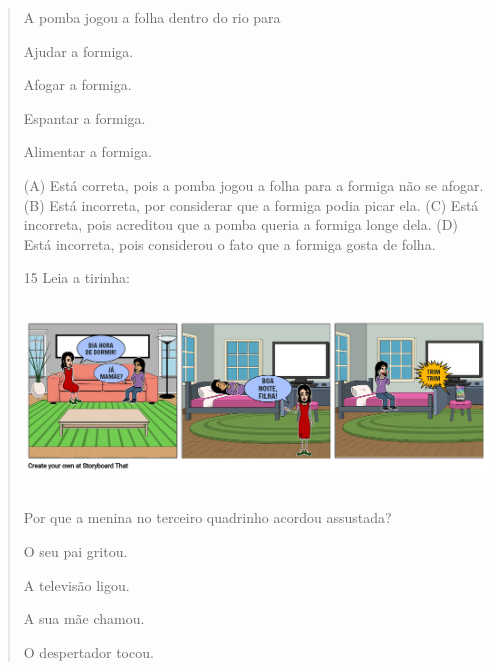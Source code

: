 \begin{verse}

A pomba jogou a folha dentro do rio para

\begin{escolha}
\item Ajudar a formiga.

\item Afogar a formiga.

\item Espantar a formiga.

\item Alimentar a formiga.
\end{escolha}


(A) Está correta, pois a pomba jogou a folha para a formiga não se afogar.
(B) Está incorreta, por considerar que a formiga podia picar ela.
(C) Está incorreta, pois acreditou que a pomba queria a formiga longe dela.
(D) Está incorreta, pois considerou o fato que a formiga gosta de folha.

\num{15} Leia a tirinha:

\includegraphics[width=5.90556in,height=1.95694in]{media/image172.png}


Por que a menina no terceiro quadrinho acordou assustada?

\begin{minipage}{.5\textwidth}
\begin{escolha}
\item O seu pai gritou.

\item A televisão ligou.

\item A sua mãe chamou.

\item O despertador tocou.
\end{escolha}
\end{minipage}
\end{verse}
